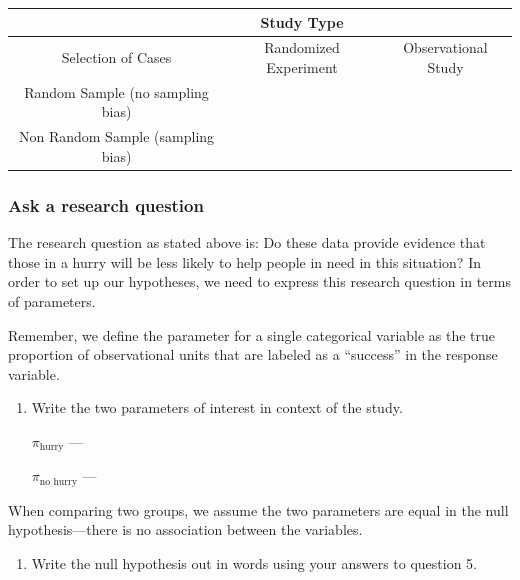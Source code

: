 \documentclass[
]{report}
\providecommand{\tightlist}{%
  \setlength{\itemsep}{0pt}\setlength{\parskip}{0pt}}
\begin{document}
\begin{center}
\begin{tabular}{|c|c|c|}\hline
& Study Type & \\ \hline
Selection of Cases & Randomized Experiment & Observational Study \\ \hline
Random Sample (no sampling bias) & & \\ \hline
Non Random Sample (sampling bias) & & \\ \hline
\end{tabular}
\end{center}


\hypertarget{ask-a-research-question}{%
\subsubsection*{Ask a research question}\label{ask-a-research-question}}

The research question as stated above is: Do these data provide evidence that those in a hurry will be less likely to help people in need in this situation? In order to set up our hypotheses, we need to express this research question in terms of parameters.

Remember, we define the parameter for a single categorical variable as the true proportion of observational units that are labeled as a ``success'' in the response variable.

\begin{enumerate}
\def\labelenumi{\arabic{enumi}.}
\setcounter{enumi}{4}
\item
  Write the two parameters of interest in context of the study.\\
  \vspace{1mm}

  \(\pi_{\text{hurry}}\) ---
  \vspace{0.5in}

  \(\pi_{\text{no hurry}}\) ---
  \vspace{0.5in}
\end{enumerate}

When comparing two groups, we assume the two parameters are equal in the null hypothesis---there is no association between the variables.

\begin{enumerate}
\def\labelenumi{\arabic{enumi}.}
\setcounter{enumi}{5}
\tightlist
\item
  Write the null hypothesis out in words using your answers to question 5.
\end{enumerate}
\end{document}
